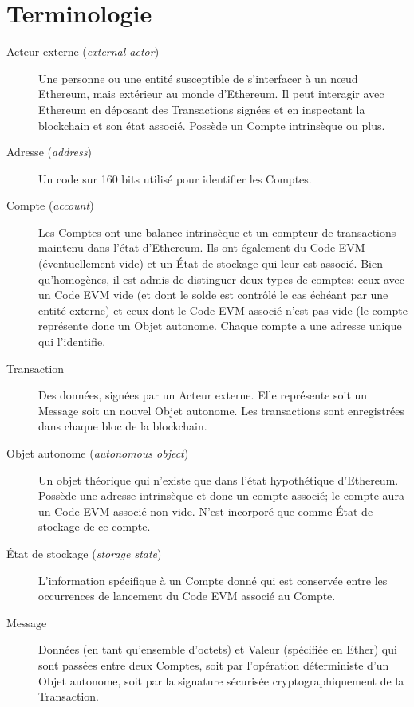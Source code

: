 \documentclass[9pt,oneside]{amsart}
\begin{document}
\appendix

\section{Terminologie}

\begin{description}
\item[Acteur externe (\textit{external actor})\,]
  Une personne ou une entité susceptible de s'interfacer à un n\oe{}ud Ethereum, mais extérieur au monde d'Ethereum. Il peut interagir avec Ethereum en déposant des Transactions signées et en inspectant la blockchain et son état associé. Possède un Compte intrinsèque ou plus.

\item[Adresse (\textit{address})\,]
  Un code sur 160 bits utilisé pour identifier les Comptes.

\item[Compte (\textit{account})\,]
  Les Comptes ont une balance intrinsèque et un compteur de transactions maintenu dans l'état d'Ethereum. Ils ont également du Code EVM (éventuellement vide) et un État de stockage qui leur est associé. Bien qu'homogènes, il est admis de distinguer deux types de comptes: ceux avec un Code EVM vide (et dont le solde est contrôlé le cas échéant par une entité externe) et ceux dont le Code EVM associé n'est pas vide (le compte représente donc un Objet autonome. Chaque compte a une adresse unique qui l'identifie.
  
\item[Transaction\,]
  Des données, signées par un Acteur externe. Elle représente soit un Message soit un nouvel Objet autonome. Les transactions sont enregistrées dans chaque bloc de la blockchain.

\item[Objet autonome (\textit{autonomous object})\,]
  Un objet théorique qui n'existe que dans l'état hypothétique d'Ethereum. Possède une adresse intrinsèque et donc un compte associé; le compte aura un Code EVM associé non vide. N'est incorporé que comme État de stockage de ce compte.

\item[État de stockage (\textit{storage state})\,]
  L'information spécifique à un Compte donné qui est conservée entre les occurrences de lancement du Code EVM associé au Compte.

\item[Message\,]
  Données (en tant qu'ensemble d'octets) et Valeur (spécifiée en Ether) qui sont passées entre deux Comptes, soit par l'opération déterministe d'un Objet autonome, soit par la signature sécurisée cryptographiquement de la Transaction.


\end{description}
\end{document}
